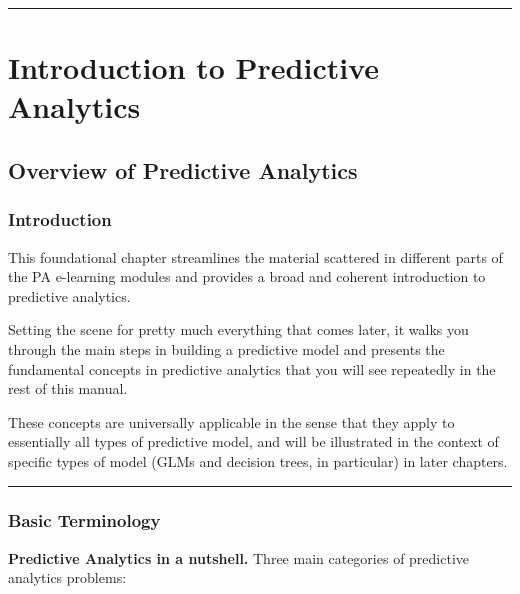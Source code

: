 \documentclass[
  12pt,
]{krantz}
\begin{document}
\begin{center}\rule{0.5\linewidth}{0.5pt}\end{center}

\part{Introduction to Predictive Analytics}\label{part-introduction-to-predictive-analytics}

\chapter{Overview of Predictive Analytics}\label{overview-of-predictive-analytics}

\section*{Introduction}\label{introduction}


This foundational chapter streamlines the material scattered in different parts
of the PA e-learning modules and provides a broad and coherent introduction to
predictive analytics.

Setting the scene for pretty much everything that comes later, it walks you
through the main steps in building a predictive model and presents the
fundamental concepts in predictive analytics that you will see repeatedly in the
rest of this manual.

These concepts are universally applicable in the sense that they apply to
essentially all types of predictive model, and will be illustrated in the
context of specific types of model (GLMs and decision trees, in particular) in
later chapters.

\begin{center}\rule{0.5\linewidth}{0.5pt}\end{center}

\section{Basic Terminology}\label{basic-terminology}

\textbf{Predictive Analytics in a nutshell.} Three main categories of predictive
analytics problems:
\end{document}
